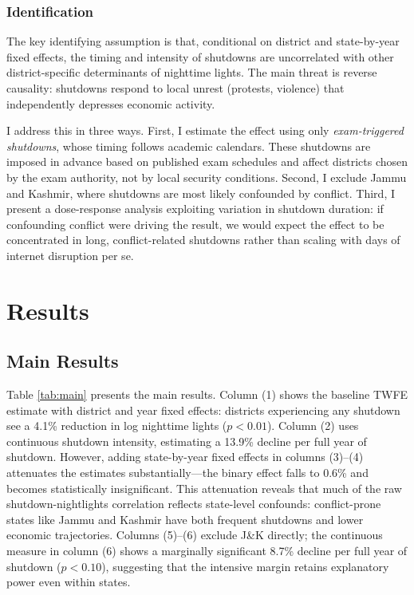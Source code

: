 \documentclass[12pt]{article}
\begin{document}
\subsubsection*{Identification} The key identifying assumption is that, conditional on district and state-by-year fixed effects, the timing and intensity of shutdowns are uncorrelated with other district-specific determinants of nighttime lights. The main threat is reverse causality: shutdowns respond to local unrest (protests, violence) that independently depresses economic activity.

I address this in three ways. First, I estimate the effect using only \emph{exam-triggered shutdowns}, whose timing follows academic calendars. These shutdowns are imposed in advance based on published exam schedules and affect districts chosen by the exam authority, not by local security conditions. Second, I exclude Jammu and Kashmir, where shutdowns are most likely confounded by conflict. Third, I present a dose-response analysis exploiting variation in shutdown duration: if confounding conflict were driving the result, we would expect the effect to be concentrated in long, conflict-related shutdowns rather than scaling with days of internet disruption per se.


\section{Results}

\subsection{Main Results}



Table \ref{tab:main} presents the main results. Column (1) shows the baseline TWFE estimate with district and year fixed effects: districts experiencing any shutdown see a 4.1\% reduction in log nighttime lights ($p < 0.01$). Column (2) uses continuous shutdown intensity, estimating a 13.9\% decline per full year of shutdown. However, adding state-by-year fixed effects in columns (3)--(4) attenuates the estimates substantially---the binary effect falls to 0.6\% and becomes statistically insignificant. This attenuation reveals that much of the raw shutdown-nightlights correlation reflects state-level confounds: conflict-prone states like Jammu and Kashmir have both frequent shutdowns and lower economic trajectories. Columns (5)--(6) exclude J\&K directly; the continuous measure in column (6) shows a marginally significant 8.7\% decline per full year of shutdown ($p < 0.10$), suggesting that the intensive margin retains explanatory power even within states.
\end{document}
